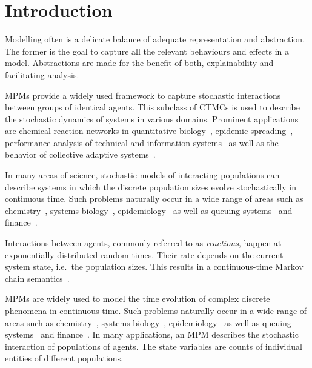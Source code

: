 \chapter{Introduction}
Modelling often is a delicate balance of adequate representation and abstraction.
The former is the goal to capture all the relevant behaviours and effects in a model.
Abstractions are made for the benefit of both, explainability and facilitating analysis.



\Acfp{MPM} provide a
widely used framework to capture stochastic interactions between groups of identical agents.
This subclass of \acfp{CTMC}  is used
to describe the stochastic dynamics of systems in various domains.
Prominent applications are chemical reaction networks in quantitative
biology~\cite{BuchWolkenhauer},
epidemic spreading~\cite{porter2016dynamical}, performance analysis  of technical and
information systems~\cite{bortolussi2013,gast2019} as well as the behavior of
collective adaptive systems~\cite{bernardo2016}.








In many areas of science, stochastic models  of interacting populations can describe systems in which the discrete population sizes evolve stochastically in continuous time.
Such problems naturally occur in a wide range of areas such as chemistry~\cite{gillespie1977exact}, systems biology~\cite{wilkinson2018stochastic,ullah2011stochastic}, epidemiology~\cite{mode2000stochastic} as well as    queuing systems~\cite{breuer2003markov} and finance~\cite{pardoux2008markov}.

Interactions between agents, commonly referred to as \emph{reactions}, happen at exponentially distributed random times. 
Their rate depends on the current system state, i.e.\ the population sizes.
This results in a continuous-time Markov chain semantics~\cite{anderson2012continuous}.






\Acp{MPM} are widely used to model the time evolution of complex  discrete phenomena in continuous time.
Such problems naturally occur in a wide range of areas such as chemistry~\cite{gillespie1977exact}, systems biology~\cite{wilkinson2018stochastic,ullah2011stochastic}, epidemiology~\cite{mode2000stochastic} as well as    queuing systems~\cite{breuer2003markov} and finance~\cite{pardoux2008markov}.
In many applications, an MPM describes the stochastic interaction of populations of agents.
The state variables are counts of individual entities of different populations.



